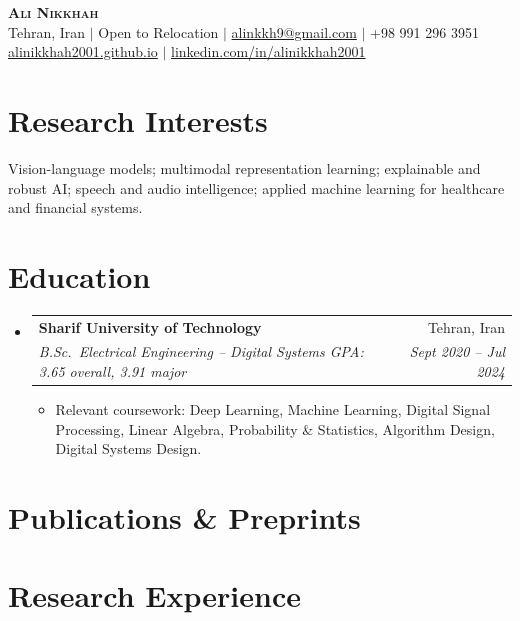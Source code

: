 \documentclass[letterpaper,11pt]{article}
\makeatletter
\newcommand{\resumeItem}[1]{
  \item\small{#1 \vspace{-2pt}}
}
\newcommand{\resumeSubheading}[4]{
  \vspace{-2pt}\item
  \begin{tabular*}{0.97\textwidth}[t]{l@{\extracolsep{\fill}}r}
    \textbf{#1} & \small #2 \\
    \textit{\small#3} & \textit{\small #4} \\
  \end{tabular*}\vspace{-7pt}
}
\newenvironment{resumeSubHeadingList}{\begin{itemize}[leftmargin=0.15in, label={}]}{\end{itemize}}
\newenvironment{resumeItemList}{\begin{itemize}[leftmargin=0.2in]}{\end{itemize}\vspace{-5pt}}
\makeatother
\begin{document}
\begin{center}
  \textbf{\Huge \scshape Ali Nikkhah} \\ \vspace{2pt}
  \small
  Tehran, Iran $|$ Open to Relocation $|$
  \href{mailto:alinkkh9@gmail.com}{alinkkh9@gmail.com} $|$
  +98 991 296 3951 \\
  \href{https://alinikkhah2001.github.io}{alinikkhah2001.github.io} $|$
  \href{https://linkedin.com/in/alinikkhah2001}{linkedin.com/in/alinikkhah2001}
\end{center}

\section{Research Interests}
\small{Vision-language models; multimodal representation learning; explainable and robust AI; speech and audio intelligence; applied machine learning for healthcare and financial systems.}
\vspace{4pt}

\section{Education}
\begin{resumeSubHeadingList}
  \resumeSubheading
    {Sharif University of Technology}{Tehran, Iran}
    {B.Sc.\ Electrical Engineering -- Digital Systems \quad GPA: 3.65 overall, 3.91 major}{Sept 2020 -- Jul 2024}
  \begin{resumeItemList}
    \resumeItem{Relevant coursework: Deep Learning, Machine Learning, Digital Signal Processing, Linear Algebra, Probability \& Statistics, Algorithm Design, Digital Systems Design.}
  \end{resumeItemList}
\end{resumeSubHeadingList}

\section{Publications \& Preprints}
\begin{itemize}[leftmargin=0.15in, label={}]
  
\end{itemize}

\section{Research Experience}
\begin{resumeSubHeadingList}
  
\end{resumeSubHeadingList}
\end{document}
